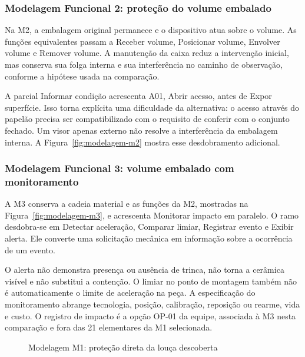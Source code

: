 \subsubsection{Modelagem Funcional 2: proteção do volume embalado}

Na M2, a embalagem original permanece e o dispositivo atua sobre o volume. As funções equivalentes passam a Receber volume, Posicionar volume, Envolver volume e Remover volume. A manutenção da caixa reduz a intervenção inicial, mas conserva sua folga interna e sua interferência no caminho de observação, conforme a hipótese usada na comparação.

A parcial Informar condição acrescenta A01, Abrir acesso, antes de Expor superfície. Isso torna explícita uma dificuldade da alternativa: o acesso através do papelão precisa ser compatibilizado com o requisito de conferir com o conjunto fechado. Um visor apenas externo não resolve a interferência da embalagem interna. A Figura~\ref{fig:modelagem-m2} mostra esse desdobramento adicional.

\subsubsection{Modelagem Funcional 3: volume embalado com monitoramento}

A M3 conserva a cadeia material e as funções da M2, mostradas na Figura~\ref{fig:modelagem-m3}, e acrescenta Monitorar impacto em paralelo. O ramo desdobra-se em Detectar aceleração, Comparar limiar, Registrar evento e Exibir alerta. Ele converte uma solicitação mecânica em informação sobre a ocorrência de um evento.

O alerta não demonstra presença ou ausência de trinca, não torna a cerâmica visível e não substitui a contenção. O limiar no ponto de montagem também não é automaticamente o limite de aceleração na peça. A especificação do monitoramento abrange tecnologia, posição, calibração, reposição ou rearme, vida e custo. O registro de impacto é a opção OP-01 da equipe, associada à M3 nesta comparação e fora das 21 elementares da M1 selecionada.

\begin{landscape}
\begin{figure}[H]
\centering
\caption{Modelagem M1: proteção direta da louça descoberta}
\label{fig:modelagem-m1}
\end{figure}
\end{landscape}

